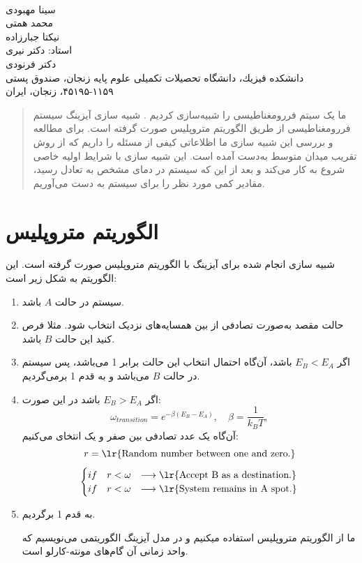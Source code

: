 \documentclass[a4paper,12pt]{article}
\begin{document}
\date{}

\begin{center}
\fontsize{25pt}{25pt}\selectfont{شبیه سازی شبکه آیزینگ دو‌بعدی با روش مونته-کارلو}\\
\end{center}
\begin{center}
سینا مهبودی\\
محمد همتی \\
 نیکتا جبار‌زاده\\
استاد: دکتر نیری \\
 دکتر فرنودی\\
\medskip
\large{
دانشكده فیزیك، دانشگاه تحصیلات تكمیلی علوم پایه زنجان، صندوق پستی ۱۱۵۹-۴۵۱۹۵، زنجان، ایران}
\end{center}
\bigskip


\begin{abstract}
ما یک سیتم فررومغناطیسی را شبیه‌سازی کردیم . شبیه سازی آیزینگ سیستم
فررومغناطیسی از طریق الگوریتم متروپلیس صورت‌ گرفته است.
برای مطالعه و بررسی این شبیه سازی ما اظلاعاتی کیفی از
مسئله را داریم که از روش تقریب میدان متوسط به‌دست آمده است.
این شبیه سازی با شرایط اولیه خاصی شروع به کار می‌کند و
بعد از این که سیستم در دمای مشخص به تعادل رسید، مقادیر کمی
مورد نظر را برای سیستم به دست می‌آوریم.

\end{abstract}
\section{الگوریتم متروپلیس}
شبیه سازی انجام شده برای آیزینگ با الگوریتم متروپلیس صورت گرفته است.
این الگوریتم به شکل زیر است:
\begin{enumerate}
 \item سیستم در حالت 
 $A$
 باشد.
 \item حالت مقصد به‌صورت تصادفی از بین همسایه‌های نزدیک انتخاب شود. 
 مثلا فرص کنید این حالت 
 $B$
 باشد.
 \item اگر $E_B<E_A$
 باشد، آن‌گاه احتمال انتخاب این حالت برابر 1 می‌باشد، پس
 سیستم در حالت $B$ می‌باشد و به قدم 1 برمی‌گردیم.
 \item اگر
 $E_B>E_A$
 باشد در این صورت:
 $$
 \omega_{transition}=e^{-\beta(E_B-E_A)} ,\quad \beta=\frac{1}{k_BT},
 $$
 آن‌گاه یک عدد تصادفی بین صفر و یک انتخای می‌کنیم:
 $$
 r=\text{\lr{Random number between one and zero.}}
 $$
 $$
\begin{cases}
 if\quad r<\omega& \longrightarrow \text{\lr{Accept B as a destination.}}\\
 if\quad r<\omega& \longrightarrow \text{\lr{System remains in A spot.}}
\end{cases}
$$
 \item به قدم 1 برگردیم.
 
ما از الگوریتم متروپلیس استفاده میکنیم و در مدل آیزینگ الگوریتمی
می‌نویسیم که واحد زمانی آن گام‌های مونته-کارلو است.
\end{enumerate}
\end{document}
